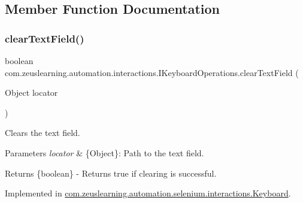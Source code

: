 \subsection{Member Function Documentation}
\hypertarget{interfacecom_1_1zeuslearning_1_1automation_1_1interactions_1_1IKeyboardOperations_adc477d38d61dc6aa4fc9c9749a20d773}{}\label{interfacecom_1_1zeuslearning_1_1automation_1_1interactions_1_1IKeyboardOperations_adc477d38d61dc6aa4fc9c9749a20d773} 
\subsubsection{\texorpdfstring{clear\+Text\+Field()}{clearTextField()}}
{\footnotesize\ttfamily boolean com.\+zeuslearning.\+automation.\+interactions.\+I\+Keyboard\+Operations.\+clear\+Text\+Field (\begin{DoxyParamCaption}\item[{Object}]{locator }\end{DoxyParamCaption})}

Clears the text field.


\begin{DoxyParams}{Parameters}
{\em locator} & \{Object\}\+: Path to the text field. \\
\hline
\end{DoxyParams}
\begin{DoxyReturn}{Returns}
\{boolean\} -\/ Returns {\ttfamily true} if clearing is successful. 
\end{DoxyReturn}


Implemented in \hyperlink{classcom_1_1zeuslearning_1_1automation_1_1selenium_1_1interactions_1_1Keyboard_aa50940a7a030455246ba1c3ee3d62d85}{com.\+zeuslearning.\+automation.\+selenium.\+interactions.\+Keyboard}.

\hypertarget{interfacecom_1_1zeuslearning_1_1automation_1_1interactions_1_1IKeyboardOperations_a4e070904ad56761bd97d494542833274}{}\label{interfacecom_1_1zeuslearning_1_1automation_1_1interactions_1_1IKeyboardOperations_a4e070904ad56761bd97d494542833274} 
